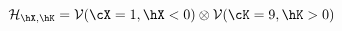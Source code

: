\begin{equation}
%
{\cal H}_{\hX,\hK} = 
{\cal V}(\cX=1, \hX<0) \otimes {\cal V}(\cK=9, \hK>0)
\label{eq:hilbert}
%
\end{equation}

